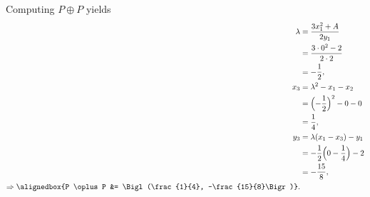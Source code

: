 \documentclass[
  coursecode={MTHE 418},
  assignmentname={Homework \homeworknumber},
  studentnumber=20053722,
  name={Bryan Hoang},
  draft,
]{
  ltxanswer%
}
\begin{document}
\begin{questions}
\begin{parts}
      \part{}
      \begin{solution}
        Computing \(P \oplus P\) yields
        \begin{align*}
          \lambda                            &= \frac{3x_{1}^{2} + A}{2y_{1}}                \\
                                             &= \frac{3 \cdot 0^{2} - 2}{2 \cdot 2}          \\
                                             &= -\frac{1}{2},                                \\
          x_{3}                              &= \lambda^{2} - x_{1} - x_{2}                  \\
                                             &= \Bigl(-\frac{1}{2}\Bigr)^{2} - 0 - 0         \\
                                             &= \frac{1}{4},                                 \\
          y_{3}                              &= \lambda(x_{1} - x_{3}) - y_{1}               \\
                                             &= -\frac{1}{2} \Bigl(0 - \frac{1}{4}\Bigr) - 2 \\
                                             &= -\frac{15}{8},                               \\
          \Rightarrow \alignedbox{P \oplus P &= \Bigl(\frac{1}{4}, -\frac{15}{8}\Bigr)}.
        \end{align*}


\end{solution}
\end{parts}
\end{questions}
\end{document}
